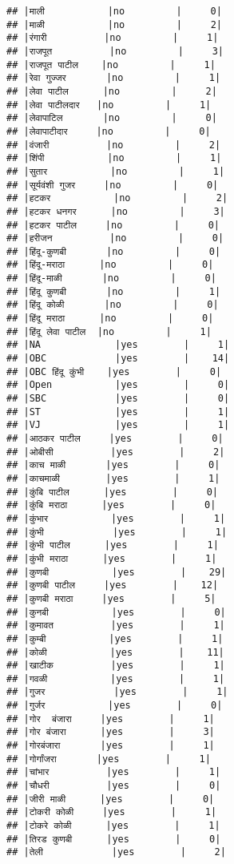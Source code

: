 \documentclass[
]{article}
\begin{document}
\begin{verbatim}
## |माली           |no         |     0|
## |माळी           |no         |     2|
## |रंगारी          |no         |     1|
## |राजपूत          |no         |     3|
## |राजपूत पाटील    |no         |     1|
## |रेवा गुज्जर       |no         |     1|
## |लेवा पाटील      |no         |     2|
## |लेवा पाटीलदार   |no         |     1|
## |लेवापाटिल       |no         |     0|
## |लेवापाटीदार     |no         |     0|
## |वंजारी          |no         |     2|
## |शिंपी           |no         |     1|
## |सुतार           |no         |     1|
## |सूर्यवंशी गुजर     |no         |     0|
## |हटकर           |no         |     2|
## |हटकर धनगर      |no         |     3|
## |हटकर पाटील     |no         |     0|
## |हरीजन          |no         |     0|
## |हिंदू-कुणबी       |no         |     0|
## |हिंदू-मराठा      |no         |     0|
## |हिंदू-माळी       |no         |     0|
## |हिंदू कुणबी       |no         |     1|
## |हिंदू कोळी       |no         |     0|
## |हिंदू मराठा      |no         |     0|
## |हिंदू लेवा पाटील  |no         |     1|
## |NA             |yes        |     1|
## |OBC            |yes        |    14|
## |OBC हिंदू कुंभी    |yes        |     0|
## |Open           |yes        |     0|
## |SBC            |yes        |     0|
## |ST             |yes        |     1|
## |VJ             |yes        |     1|
## |आठकर पाटील     |yes        |     0|
## |ओबीसी          |yes        |     2|
## |काच माळी       |yes        |     0|
## |काचमाळी        |yes        |     1|
## |कुंबि पाटील      |yes        |     0|
## |कुंबि मराठा      |yes        |     0|
## |कुंभार           |yes        |     1|
## |कुंभी            |yes        |     1|
## |कुंभी पाटील      |yes        |     1|
## |कुंभी मराठा      |yes        |     1|
## |कुणबी           |yes        |    29|
## |कुणबी पाटील     |yes        |    12|
## |कुणबी मराठा     |yes        |     5|
## |कुनबी           |yes        |     0|
## |कुमावत          |yes        |     1|
## |कुम्बी           |yes        |     1|
## |कोळी           |yes        |    11|
## |खाटीक          |yes        |     1|
## |गवळी           |yes        |     1|
## |गुजर            |yes        |     1|
## |गुर्जर           |yes        |     0|
## |गोर  बंजारा     |yes        |     1|
## |गोर बंजारा      |yes        |     3|
## |गोरबंजारा       |yes        |     1|
## |गोर्गांजरा       |yes        |     1|
## |चांभार          |yes        |     1|
## |चौधरी          |yes        |     0|
## |जीरी माळी      |yes        |     0|
## |टोकरी कोळी     |yes        |     1|
## |टोकरे कोळी      |yes        |     1|
## |तिरड कुणबी      |yes        |     0|
## |तेली            |yes        |     2|

\end{verbatim}
\end{document}
